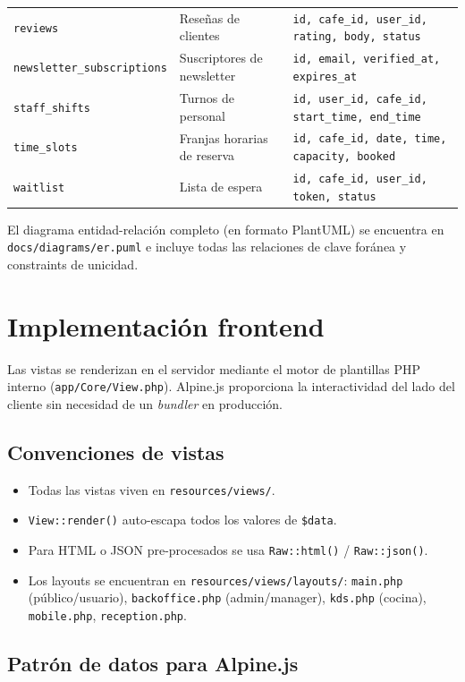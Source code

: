 \documentclass[12pt,a4paper,twoside,openright]{report}
\begin{document}
\begin{longtable}{@{}lp{5cm}p{5cm}@{}}
  \texttt{reviews}
    & Reseñas de clientes
    & \texttt{id, cafe\_id, user\_id, rating, body, status}\\
  \texttt{newsletter\_subscriptions}
    & Suscriptores de newsletter
    & \texttt{id, email, verified\_at, expires\_at}\\
  \texttt{staff\_shifts}
    & Turnos de personal
    & \texttt{id, user\_id, cafe\_id, start\_time, end\_time}\\
  \texttt{time\_slots}
    & Franjas horarias de reserva
    & \texttt{id, cafe\_id, date, time, capacity, booked}\\
  \texttt{waitlist}
    & Lista de espera
    & \texttt{id, cafe\_id, user\_id, token, status}\\
\end{longtable}

El diagrama entidad-relación completo (en formato PlantUML) se encuentra en
\texttt{docs/diagrams/er.puml} e incluye todas las relaciones de clave foránea
y constraints de unicidad.

\section{Implementación frontend}
\label{sec:frontend}

Las vistas se renderizan en el servidor mediante el motor de plantillas PHP interno
(\texttt{app/Core/View.php}). Alpine.js proporciona la interactividad del lado del
cliente sin necesidad de un \textit{bundler} en producción.

\subsection{Convenciones de vistas}
\begin{itemize}[nosep]
  \item Todas las vistas viven en \texttt{resources/views/}.
  \item \texttt{View::render()} auto-escapa todos los valores de \texttt{\$data}.
  \item Para HTML o JSON pre-procesados se usa \texttt{Raw::html()} / \texttt{Raw::json()}.
  \item Los layouts se encuentran en \texttt{resources/views/layouts/}:
    \texttt{main.php} (público/usuario), \texttt{backoffice.php} (admin/manager),
    \texttt{kds.php} (cocina), \texttt{mobile.php}, \texttt{reception.php}.
\end{itemize}

\subsection{Patrón de datos para Alpine.js}
\end{document}

